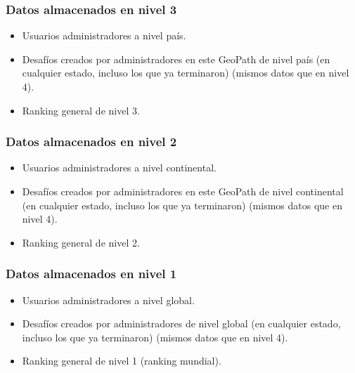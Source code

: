\subsubsection{Datos almacenados en nivel 3}

\begin{itemize}
	\item Usuarios administradores a nivel país.

	\item Desafíos creados por administradores en este GeoPath de nivel país (en cualquier estado, incluso los que ya terminaron) (mismos datos que en nivel 4).
	
	\item Ranking general de nivel 3.
\end{itemize}

\subsubsection{Datos almacenados en nivel 2}

\begin{itemize}
	\item Usuarios administradores a nivel continental.

	\item Desafíos creados por administradores en este GeoPath de nivel continental (en cualquier estado, incluso los que ya terminaron) (mismos datos que en nivel 4).
	
	\item Ranking general de nivel 2.
\end{itemize}

\subsubsection{Datos almacenados en nivel 1}

\begin{itemize}
	\item Usuarios administradores a nivel global.

	\item Desafíos creados por administradores de nivel global (en cualquier estado, incluso los que ya terminaron) (mismos datos que en nivel 4).
	
	\item Ranking general de nivel 1 (ranking mundial).
\end{itemize}